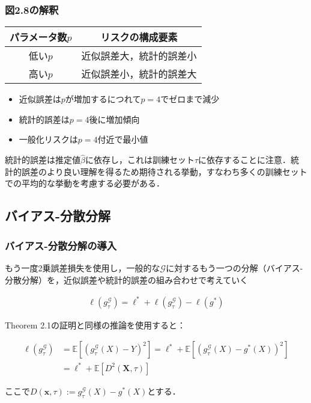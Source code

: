 \documentclass[dvipdfmx,cjk]{beamer}
\theoremstyle{example}
\begin{document}
\begin{frame}
    \frametitle{図2.8の解釈}
    \begin{center}
        \begin{tabular}{|c|c|}
            \hline
            パラメータ数$p$ & リスクの構成要素     \\
            \hline
            低い$p$     & 近似誤差大，統計的誤差小 \\
            高い$p$     & 近似誤差小，統計的誤差大 \\
            \hline
        \end{tabular}
    \end{center}

    \begin{itemize}
        \item 近似誤差は$p$が増加するにつれて$p = 4$でゼロまで減少
        \item 統計的誤差は$p = 4$後に増加傾向
        \item 一般化リスクは$p = 4$付近で最小値
    \end{itemize}

    統計的誤差は推定値$\hat{\beta}$に依存し，これは訓練セット$\tau$に依存することに注意．統計的誤差のより良い理解を得るため期待される挙動，すなわち多くの訓練セットでの平均的な挙動を考慮する必要がある．
\end{frame}

\subsection{バイアス-分散分解}
\begin{frame}
    \frametitle{バイアス-分散分解の導入}
    もう一度2乗誤差損失を使用し，一般的な$\mathcal{G}$に対するもう一つの分解（バイアス-分散分解）を，近似誤差や統計的誤差の組み合わせで考えていく

    \begin{align*}
        \ell(g_\tau^{\mathcal{G}}) = \ell^* + \ell(g^\mathcal{G}_\tau)-\ell(g^*)
    \end{align*}

    Theorem 2.1の証明と同様の推論を使用すると：

    \begin{align*}
        \ell(g_\tau^{\mathcal{G}}) & = \mathbb{E}[(g_\tau^{\mathcal{G}}(X) - Y)^2] = \ell^* + \mathbb{E}[(g_\tau^{\mathcal{G}}(X) - g^*(X))^2] \\
                                   & =\ell^*+\mathbb{E}\left[D^2(\boldsymbol{X},\tau)\right]
    \end{align*}

    ここで$D(\boldsymbol{x}, \tau) := g_\tau^{\mathcal{G}}(X) - g^*(X)$とする．
\end{frame}
\end{document}
